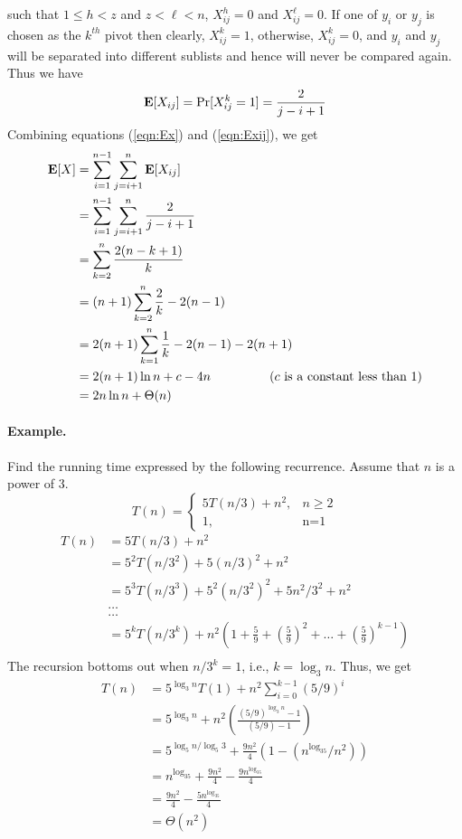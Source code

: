\documentclass[11pt,twoside]{article}
\newcommand{\E}{{\mbox {\bf E}}}
\begin{document}
such that  $1\leq h < z$ and $z< \ell <n$, $X_{ij}^h=0$ and
$X_{ij}^{\ell}=0$. If one of $y_i$ or $y_j$ is chosen as the $k^{th}$
pivot then clearly, $X_{ij}^{k}=1$, otherwise, $X_{ij}^{k}=0$, and
$y_i$ and $y_j$ will be separated into different sublists and hence will
never be compared again.  Thus we have
\begin{equation}
\label{eqn:Exij}
\E[X_{ij}] = \Pr[X_{ij}^{k}=1] = \frac{2}{j-i+1}
\end{equation}
Combining equations (\ref{eqn:Ex}) and (\ref{eqn:Exij}), we get
\begin{align*}
\E[X] &= \sum_{i=1}^{n-1}\sum_{j=i+1}^{n}\E[X_{ij}] \\
      &= \sum_{i=1}^{n-1}\sum_{j=i+1}^{n}\frac{2}{j-i+1} \\
      &= \sum_{k=2}^{n}\frac{2(n-k+1)}{k} \\
      &= (n+1)\sum_{k=2}^{n}\frac{2}{k} - 2(n-1)  \\
      &= 2(n+1)\sum_{k=1}^{n}\frac{1}{k} - 2(n-1)-2(n+1) \\ 
      &= 2(n+1)\ln n + c - 4n  \mbox{~~~~~~~~~~~~~~($c$ is a constant less than 1)}\\
      &= 2n\ln n + \Theta(n)
\end{align*}


\paragraph{Example.} Find the running time expressed by the following
recurrence. Assume that $n$ is a power of 3.
\[
T(n) = \left\{ \begin{array}{ll}
      5T(n/3) + n^2, &  n \geq 2 \\
      1, & \mbox{n=1}
      \end{array} \right.
\]
\begin{align*}
T(n) & =  5T(n/3) + n^2 \\
& =  5^2T(n/3^2) + 5(n/3)^2 + n^2 \\
& = 5^3T(n/3^3) + 5^2(n/3^2)^2 + 5n^2/3^2 + n^2 \\
&  \ldots \\
&  \ldots \\
& = 5^kT(n/3^k) + n^2\left (1 + \frac{5}{9} + \left (\frac{5}{9}\right
)^2 +\ldots + \left(\frac{5}{9} \right )^{k-1}\right ) \\ 
\end{align*}
\noindent
The recursion bottoms out when $n/3^k = 1$, i.e., $k=\log_3 n$. Thus, we get
\begin{align*}
T(n) & =  5^{\log_3n}T(1) + n^2\sum_{i=0}^{k-1}(5/9)^i \\
     & = 5^{\log_3n} + n^2\left (\frac{(5/9)^{\log_3 n}-1}{(5/9) -1} \right ) \\
     & = 5^{\log_5 n/\log_5 3} + \frac{9n^2}{4}\left (1 - (n^{\log_35}/n^2) \right ) \\
     & = n^{\log_35} + \frac{9n^2}{4} - \frac{9n^{\log_35}}{4} \\
     & = \frac{9n^2}{4} - \frac{5n^{\log_35}}{4} \\
     & = \Theta(n^2)
\end{align*}
\end{document}
